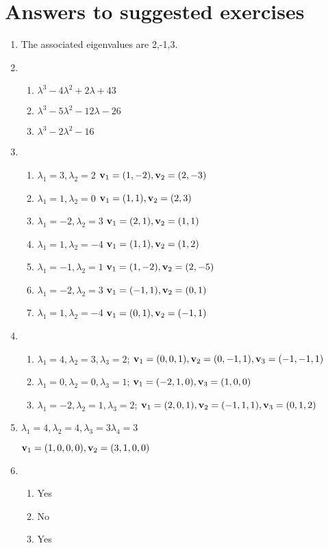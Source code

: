 \section{Answers to suggested exercises}\label{ssec.se7}
\begin{enumerate}
\item The associated eigenvalues are 2,-1,3.
\item \begin{enumerate}
\item $\lambda^3-4 \lambda^2+2\lambda+43  $
\item $\lambda^3-5\lambda^2-12 \lambda-26  $
\item $\lambda^3-2\lambda^2-16$
\end{enumerate}

\item \begin{enumerate}
\item $\lambda_1=3, \lambda_2=2$ \quad ${\bf v}_1=(1,-2), {\bf
v}_2=(2,-3)$

\item $\lambda_1=1, \lambda_2=0$ \quad ${\bf v}_1=(1,1), {\bf
v}_2=(2,3)$

\item $\lambda_1=-2, \lambda_2=3$ \quad ${\bf v}_1=(2,1), {\bf
v}_2=(1,1)$

\item $\lambda_1=1, \lambda_2=-4$ \quad ${\bf v}_1=(1,1), {\bf
v}_2=(1,2)$

\item $\lambda_1=-1, \lambda_2=1$ \quad ${\bf v}_1=(1,-2), {\bf
v}_2=(2,-5)$

\item $\lambda_1=-2, \lambda_2=3$ \quad ${\bf v}_1=(-1,1), {\bf
v}_2=(0,1)$

\item $\lambda_1=1, \lambda_2=-4$ \quad ${\bf v}_1=(0,1), {\bf
v}_2=(-1,1)$
\end{enumerate}

\item \begin{enumerate}
\item $\lambda_1=4, \lambda_2=3, \lambda_3=2$;
${\bf v}_1=(0,0,1), {\bf v}_2=(0,-1,1), {\bf v}_3=(-1,-1,1)$

\item $\lambda_1=0, \lambda_2=0, \lambda_3=1$;
${\bf v}_1=(-2,1,0), {\bf v}_3=(1,0,0)$

\item $\lambda_1=-2, \lambda_2=1, \lambda_3=2$;
${\bf v}_1=(2,0,1), {\bf v}_2=(-1,1,1), {\bf v}_3=(0,1,2)$
\end{enumerate}
\item
$\lambda_1=4, \lambda_2=4, \lambda_3=3 \lambda_4=3$

${\bf v}_1=(1,0,0,0), {\bf v}_2=(3,1,0,0)$
\item \begin{enumerate}
\item Yes
\item No
\item Yes
\end{enumerate}
\end{enumerate}

%
